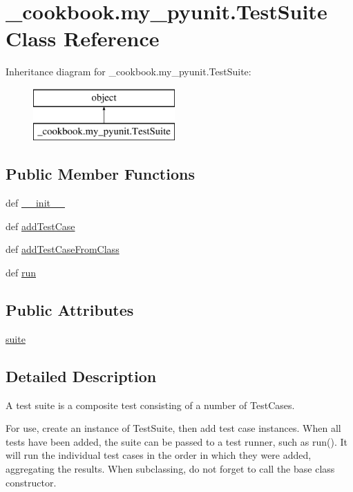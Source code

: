 \hypertarget{class__cookbook_1_1my__pyunit_1_1TestSuite}{\section{\-\_\-cookbook.\-my\-\_\-pyunit.\-Test\-Suite Class Reference}
\label{class__cookbook_1_1my__pyunit_1_1TestSuite}
}
Inheritance diagram for \-\_\-cookbook.\-my\-\_\-pyunit.\-Test\-Suite\-:\begin{figure}[H]
\begin{center}
\leavevmode
\includegraphics[height=2.000000cm]{df/def/class__cookbook_1_1my__pyunit_1_1TestSuite}
\end{center}
\end{figure}
\subsection*{Public Member Functions}
\begin{DoxyCompactItemize}
\item 
def \hyperlink{class__cookbook_1_1my__pyunit_1_1TestSuite_a9ac8bc8c1f00434b0a16985762c3bc30}{\-\_\-\-\_\-init\-\_\-\-\_\-}
\item 
def \hyperlink{class__cookbook_1_1my__pyunit_1_1TestSuite_af7fc14f84559e4ac099b3a991f4fe077}{add\-Test\-Case}
\item 
def \hyperlink{class__cookbook_1_1my__pyunit_1_1TestSuite_a246a14a895b60b1765e1a4da7c16191a}{add\-Test\-Case\-From\-Class}
\item 
def \hyperlink{class__cookbook_1_1my__pyunit_1_1TestSuite_a0dc0859f477dc0c3d564f2148cdbba1c}{run}
\end{DoxyCompactItemize}
\subsection*{Public Attributes}
\begin{DoxyCompactItemize}
\item 
\hyperlink{class__cookbook_1_1my__pyunit_1_1TestSuite_aa72351c9916112e29864390633a480a0}{suite}
\end{DoxyCompactItemize}


\subsection{Detailed Description}
\begin{DoxyVerb}A test suite is a composite test consisting of a number of TestCases.

For use, create an instance of TestSuite, then add test case instances.
When all tests have been added, the suite can be passed to a test
runner, such as run(). It will run the individual test cases
in the order in which they were added, aggregating the results. When
subclassing, do not forget to call the base class constructor.
\end{DoxyVerb}
 

